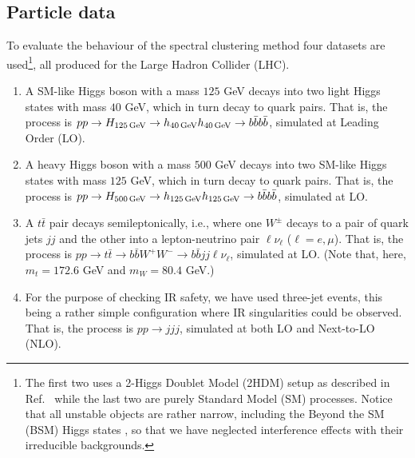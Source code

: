     \subsection{Particle data}\label{sec:particle_data}

To evaluate the behaviour of the spectral clustering method four datasets are used\footnote{The first two uses a 2-Higgs Doublet Model (2HDM) setup as described in Ref.~\cite{Chakraborty:2020vwj} while the last two are purely Standard Model (SM) processes. Notice that all unstable objects are rather narrow, including the Beyond the SM (BSM) Higgs states \cite{Moretti:1994ds,Djouadi:1995gv}, so that we have neglected interference effects with their irreducible backgrounds.}, all produced for the Large Hadron Collider (LHC).

    \begin{enumerate}
        \item 
     A SM-like Higgs boson with a mass \(125\) GeV decays into two light Higgs states with mass  \(40\) GeV,
    which in turn decay to \beau{}\bbar{} quark pairs.
    That is, the process is \(p p \rightarrow H_{125\,\text{GeV}} \rightarrow h_{40\,\text{GeV}} h_{40\,\text{GeV}} \rightarrow b \bar{b} b \bar{b}\), simulated at Leading Order (LO).

\item {}  A heavy Higgs boson with a mass \(500\) GeV decays into two SM-like Higgs states with mass  \(125\) GeV,
    which in turn decay to \beau{}\bbar{} quark pairs.
    That is, the process is \(p p \rightarrow H_{500\,\text{GeV}} \rightarrow h_{125\,\text{GeV}} h_{125\,\text{GeV}} \rightarrow b \bar{b} b \bar{b}\), simulated at LO.

\item {}  A $t\bar t$ pair decays semileptonically, i.e., where one \(W^\pm\) decays to a pair of quark jets $jj$ and the other into a lepton-neutrino pair $\ell\nu_\ell$ ($\ell=e,\mu$).
        That is, the process is \( p p \rightarrow t \bar{t} \rightarrow b\bar b W^+  W^-\to b\bar b jj \ell\nu_\ell\), simulated at LO. (Note that, here, $m_t=172.6$ GeV and $m_{W}=80.4$ GeV.)
        
    \item {}  For the purpose of checking {IR safety}, we have used three-jet events,         this being a rather simple configuration where IR singularities could be observed. 
        That is, the process is $pp\to jjj$, simulated at both LO and Next-to-LO (NLO). 



    \end{enumerate}

